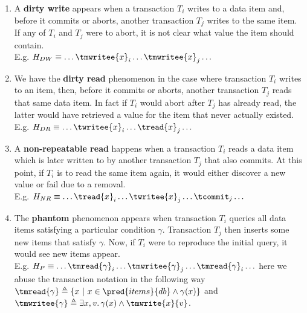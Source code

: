 \begin{enumerate}[label=(\textbf{P\arabic*})]\addtocounter{enumi}{-1}
\item \label{ansi:0} A \textbf{dirty write} appears when a transaction $T_i$ writes to a data item and, before it commits or aborts, another transaction $T_j$ writes to the same item. If any of $T_i$ and $T_j$ were to abort, it is not clear what value the item should contain.
\\
E.g. $H_{DW} \equiv \ldots \tmwritee{x}_i \ldots \tmwritee{x}_j \ldots$
\item We have the \textbf{dirty read} phenomenon in the case where transaction $T_i$ writes to an item, then, before it commits or aborts, another transaction $T_j$ reads that same data item. In fact if $T_i$ would abort after $T_j$ has already read, the latter would have retrieved a value for the item that never actually existed.
\\
E.g. $H_{DR} \equiv \ldots \twritee{x}_i \ldots \tread{x}_j \ldots$
\item A \textbf{non-repeatable read} happens when a transaction $T_i$ reads a data item which is later written to by another transaction $T_j$ that also commits. At this point, if $T_i$ is to read the same item again, it would either discover a new value or fail due to a removal.
\\
E.g. $H_{NR} \equiv \ldots \tread{x}_i \ldots \twritee{x}_j \ldots \tcommit_j \ldots$
\item The \textbf{phantom} phenomenon appears when transaction $T_i$ queries all data items satisfying a particular condition $\gamma$. Transaction $T_j$ then inserts some new items that satisfy $\gamma$. Now, if $T_i$ were to reproduce the initial query, it would see new items appear.
\\
E.g. $H_{P} \equiv \ldots \tmread{\gamma}_i \ldots \tmwritee{\gamma}_j \ldots \tmread{\gamma}_i \ldots$ here we abuse the transaction notation in the following way $\tmread{\gamma} \triangleq \left\lbrace x\ |\ x \in \pred{items}{db} \land \gamma(x) \right\rbrace$ and $\tmwritee{\gamma} \triangleq \exists x, v \ldotp \gamma(x) \land \tmwrite{x}{v}$.
\end{enumerate}

